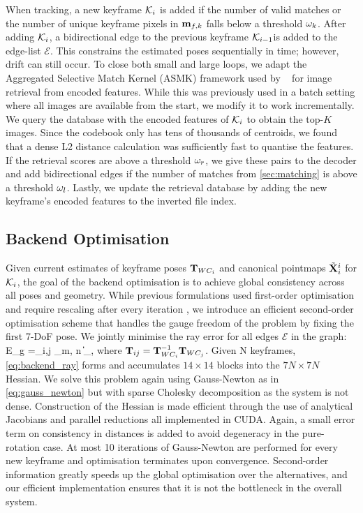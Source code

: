 \documentclass[10pt,twocolumn,letterpaper]{article}
\begin{document}
When tracking, a new keyframe $\mathcal{K}_i$ is added if the number of valid matches or the number of unique keyframe pixels in ${{\mathbf {m}}}_{f,k}$ falls below a threshold $\omega_k$.
After adding  $\mathcal{K}_i$, a bidirectional edge to the previous keyframe  $\mathcal{K}_{i-1}$is added to the edge-list $\mathcal{E}$.
This constrains the estimated poses sequentially in time; however, drift can still occur.  To close both small and large loops, we adapt the Aggregated Selective Match Kernel (ASMK) \cite{tolias_asmk_2013, tolias_learning_2020} framework used by \mastersfm~\cite{duisterhof_2024_mast3rsfm} for image retrieval from encoded features.
While this was previously used in a batch setting where all images are available from the start, we modify it to work incrementally.
We query the database with the encoded features of $\mathcal{K}_i$ to obtain the top-$K$ images. Since the codebook only has tens of thousands of centroids, we found that a dense L2 distance calculation was sufficiently fast to quantise the features.
If the retrieval scores are above a threshold $\omega_r$, we give these pairs to the \master decoder and add bidirectional edges if the number of matches from \cref{sec:matching} is above a threshold $\omega_l$.  Lastly, we update the retrieval database by adding the new keyframe's encoded features to the inverted file index.

\subsection{Backend Optimisation}
Given current estimates of keyframe poses ${{\mathbf T}}_{WC_i}$ and canonical pointmaps $\tilde{{{\mathbf X}}}^i_{i}$ for $\mathcal{K}_i$, the goal of the backend optimisation is to achieve global consistency across all poses and geometry.  While previous formulations used first-order optimisation and require rescaling after every iteration \cite{wang_dust3r_cvpr24, duisterhof_2024_mast3rsfm}, we introduce an efficient second-order optimisation scheme that handles the gauge freedom of the problem by fixing the first 7-DoF  pose.  We jointly minimise the ray error for all edges $\mathcal{E}$ in the graph:
\beq
E_g {=}\sum_{{i,j} \in {}}\sum_{{m, n} \in {}}\left\|\right\|_{\rho}, \label{eq:backend_ray}
\eeq
where ${{\mathbf T}}_{ij}={{\mathbf T}}_{WC_i}^{-1}{{\mathbf T}}_{WC_j}$.
Given N keyframes, \cref{eq:backend_ray} forms and accumulates $14 \times 14$ blocks into the $7N\times 7N$ Hessian.  We solve this problem again using Gauss-Newton as in \cref{eq:gauss_newton} but with sparse Cholesky decomposition as the system is not dense.  Construction of the Hessian is made efficient through the use of analytical Jacobians and parallel reductions all implemented in CUDA.
Again, a small error term on consistency in distances is added to avoid degeneracy in the pure-rotation case. At most 10 iterations of Gauss-Newton are performed for every new keyframe and optimisation terminates upon convergence.  Second-order information greatly speeds up the global optimisation over the alternatives, and our efficient implementation ensures that it is not the bottleneck in the overall system.
\end{document}

